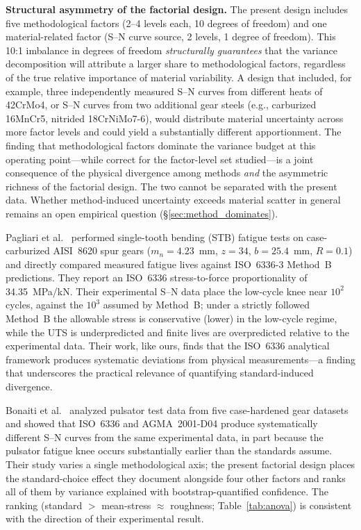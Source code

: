 \documentclass[twocolumn,12pt,a4paper]{article}
\begin{document}
\textbf{Structural asymmetry of the factorial design.} The present
design includes five methodological factors (2--4 levels each,
10 degrees of freedom) and one material-related factor (S--N curve
source, 2 levels, 1 degree of freedom). This 10:1 imbalance in
degrees of freedom \emph{structurally guarantees} that the variance
decomposition will attribute a larger share to methodological factors,
regardless of the true relative importance of material variability.
A design that included, for example, three independently measured
S--N curves from different heats of 42CrMo4, or S--N curves from two
additional gear steels (e.g., carburized 16MnCr5, nitrided
18CrNiMo7-6), would distribute material uncertainty across more factor
levels and could yield a substantially different apportionment. The
finding that methodological factors dominate the variance budget at
this operating point---while correct for the factor-level set
studied---is a joint consequence of the physical divergence among
methods \emph{and} the asymmetric richness of the factorial design.
The two cannot be separated with the present data. Whether
method-induced uncertainty exceeds material scatter in general remains
an open empirical question (\S\ref{sec:method_dominates}).

Pagliari et al.~\cite{pagliari2025} performed single-tooth bending (STB)
fatigue tests on case-carburized AISI~8620 spur gears
($m_n{=}4.23$~mm, $z{=}34$, $b{=}25.4$~mm, $R{=}0.1$) and directly
compared measured fatigue lives against ISO~6336-3 Method~B predictions.
They report an ISO~6336 stress-to-force proportionality of
34.35~MPa/kN. Their experimental S--N data place the low-cycle knee near
$10^2$ cycles, against the $10^3$ assumed by Method~B; under a strictly
followed Method~B the allowable stress is conservative (lower) in the
low-cycle regime, while the UTS is underpredicted and finite lives are
overpredicted relative to the experimental data. Their work, like ours,
finds that the ISO~6336 analytical
framework produces systematic deviations from physical measurements---a
finding that underscores the practical relevance of quantifying
standard-induced divergence.

Bonaiti et al.~\cite{bonaiti2024} analyzed pulsator test data from five
case-hardened gear datasets and showed that ISO~6336 and AGMA~2001-D04
produce systematically different S--N curves from the same experimental
data, in part because the pulsator fatigue knee occurs substantially
earlier than the standards assume. Their study varies a single
methodological axis; the present factorial design places the
standard-choice effect they document alongside four other factors and
ranks all of them by variance explained with bootstrap-quantified
confidence. The ranking (standard $>$ mean-stress $\approx$ roughness;
Table~\ref{tab:anova}) is consistent with the direction of their
experimental result.
\end{document}
